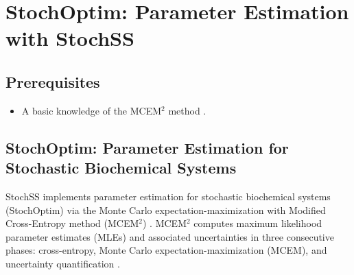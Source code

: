\chapter{StochOptim: Parameter Estimation with StochSS}

\section{\label{sec:pre}Prerequisites}
\begin{itemize}
\item A basic knowledge of the MCEM$^2$ method \cite{bernie,dan,caffo}. 
\end{itemize}


\section{StochOptim: Parameter Estimation for Stochastic Biochemical Systems}
StochSS implements parameter estimation for stochastic biochemical systems (StochOptim) via the Monte Carlo expectation-maximization with Modified Cross-Entropy method (MCEM$^2$) \cite{bernie}.
MCEM$^2$ computes maximum likelihood parameter estimates (MLEs) and associated uncertainties in three consecutive phases: cross-entropy, Monte Carlo expectation-maximization (MCEM), and uncertainty quantification \cite{bernie}.

